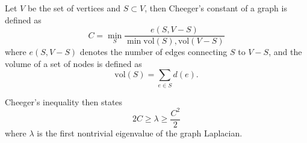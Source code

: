 Let $V$ be the set of vertices and $S\subset V$, then Cheeger's
constant of a graph is defined as
\[ C=\min_S \frac{e(S,V-S)}
        {\min{\mathord{\mathrm{vol}}(S),\mathord{\mathrm{vol}}(V-S)}}
\]
where $e(S,V-S)$ denotes the number of edges connecting $S$ to $V-S$,
and the volume of a set of nodes is defined as
\[ \mathord{\mathrm{vol}}(S) = \sum_{e\in S}d(e). \]

Cheeger's inequality then states
\[ 2C \geq \lambda \geq \frac{C^2}2 \]
where $\lambda$ is the first nontrivial eigenvalue of the graph
Laplacian.

